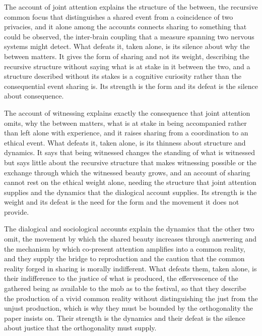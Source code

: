 The account of joint attention explains the structure of the between, the recursive common focus that distinguishes a shared event from a coincidence of two privacies, and it alone among the accounts connects sharing to something that could be observed, the inter-brain coupling that a measure spanning two nervous systems might detect. What defeats it, taken alone, is its silence about why the between matters. It gives the form of sharing and not its weight, describing the recursive structure without saying what is at stake in it between the two, and a structure described without its stakes is a cognitive curiosity rather than the consequential event sharing is. Its strength is the form and its defeat is the silence about consequence.

The account of witnessing explains exactly the consequence that joint attention omits, why the between matters, what is at stake in being accompanied rather than left alone with experience, and it raises sharing from a coordination to an ethical event. What defeats it, taken alone, is its thinness about structure and dynamics. It says that being witnessed changes the standing of what is witnessed but says little about the recursive structure that makes witnessing possible or the exchange through which the witnessed beauty grows, and an account of sharing cannot rest on the ethical weight alone, needing the structure that joint attention supplies and the dynamics that the dialogical account supplies. Its strength is the weight and its defeat is the need for the form and the movement it does not provide.

The dialogical and sociological accounts explain the dynamics that the other two omit, the movement by which the shared beauty increases through answering and the mechanism by which co-present attention amplifies into a common reality, and they supply the bridge to reproduction and the caution that the common reality forged in sharing is morally indifferent. What defeats them, taken alone, is their indifference to the justice of what is produced, the effervescence of the gathered being as available to the mob as to the festival, so that they describe the production of a vivid common reality without distinguishing the just from the unjust production, which is why they must be bounded by the orthogonality the paper insists on. Their strength is the dynamics and their defeat is the silence about justice that the orthogonality must supply.

